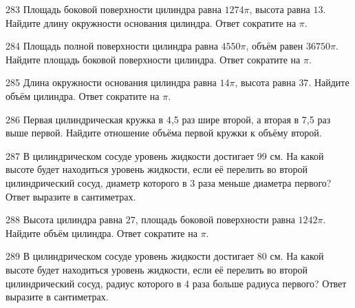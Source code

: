 \documentclass[4apaper]{article}
\begin{document}
\begin{taskBN}{283}
Площадь боковой поверхности цилиндра равна $1274\pi$, высота равна $13$. Найдите длину окружности основания цилиндра. Ответ сократите на $\pi$.
\end{taskBN}

\begin{taskBN}{284}
Площадь полной поверхности цилиндра равна $4550\pi$, объём равен $36750\pi$. Найдите площадь боковой поверхности цилиндра. Ответ сократите на $\pi$.
\end{taskBN}

\begin{taskBN}{285}
Длина окружности основания цилиндра равна $14\pi$, высота равна $37$. Найдите объём цилиндра. Ответ сократите на $\pi$.
\end{taskBN}

\begin{taskBN}{286}
 Первая цилиндрическая кружка в 4,5 раз шире второй, а вторая в 7,5 раз выше первой. Найдите отношение объёма первой кружки к объёму второй.
\end{taskBN}

\begin{taskBN}{287}
В цилиндрическом сосуде уровень жидкости достигает 99 см. На какой высоте будет находиться уровень жидкости, если её перелить во второй цилиндрический сосуд, диаметр которого в 3 раза меньше диаметра первого? Ответ выразите в сантиметрах.
\end{taskBN}

\begin{taskBN}{288}
Высота цилиндра равна $27$, площадь боковой поверхности равна $1242\pi$. Найдите объём цилиндра. Ответ сократите на $\pi$.
\end{taskBN}

\begin{taskBN}{289}
В цилиндрическом сосуде уровень жидкости достигает 80 см. На какой высоте будет находиться уровень жидкости, если её перелить во второй цилиндрический сосуд, радиус которого в 4 раза больше радиуса первого? Ответ выразите в сантиметрах.
\end{taskBN}
\end{document}

